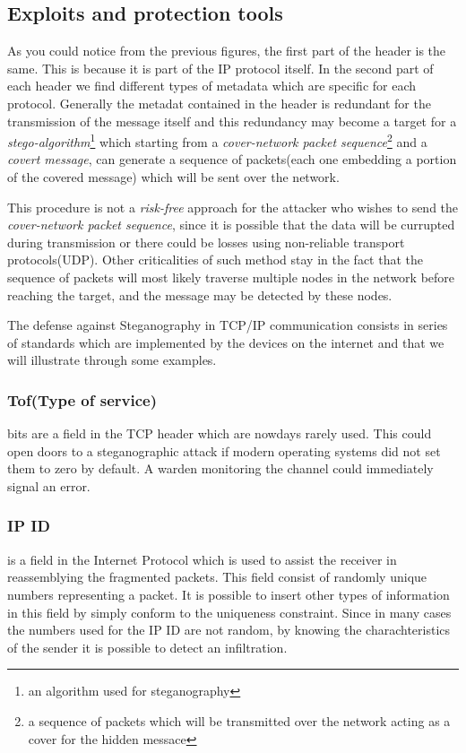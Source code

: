 \documentclass[../../main.tex]{subfiles}
\begin{document}
\subsection{Exploits and protection tools}

As you could notice from the previous figures, the first part of the header
is the same. This is because it is part of the IP protocol itself.
In the second part of each header we find different types of metadata which
are specific for each protocol. Generally the metadat contained in the
header is redundant for the transmission of the message itself and this 
redundancy may become a target for a \emph{stego-algorithm}\footnote{an
algorithm used for steganography} which starting from a \emph{cover-network
packet sequence}\footnote{a sequence of packets which will be transmitted
over the network acting as a cover for the hidden messace} and a
\emph{covert message}, can generate a sequence of packets(each one embedding
a portion of the covered message) which will be sent over the network.

This procedure is not a \emph{risk-free} approach for the attacker who
wishes to send the \emph{cover-network packet sequence}, since it is
possible that the data will be currupted during transmission or there could
be losses using non-reliable transport protocols(UDP).
Other criticalities of such method stay in the fact that the sequence of
packets will most likely traverse multiple nodes in the network before
reaching the target, and the message may be detected by these nodes.

The defense against Steganography in TCP/IP communication consists in 
series of standards which are implemented by the devices on the internet and
that we will illustrate through some examples.


\subsubsection{Tof(Type of service)} bits are a field in the TCP header which
are nowdays rarely used. This could open doors to a steganographic attack if
modern operating systems did not set them to zero by default.
A warden monitoring the channel could immediately signal an error.

\subsubsection{IP ID} is a field in the Internet Protocol which is used to
assist the receiver in reassemblying the fragmented packets.
This field consist of randomly unique numbers representing a packet.
It is possible to insert other types of information in this field by simply
conform to the uniqueness constraint.
Since in many cases the numbers used for the IP ID are not random, by
knowing the charachteristics of the sender it is possible to detect an
infiltration.
\end{document}
